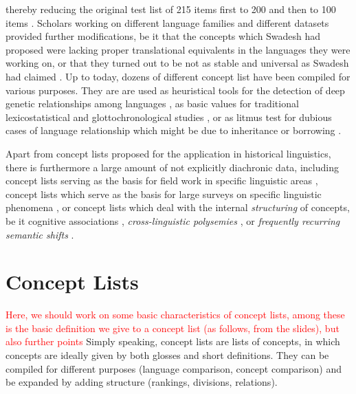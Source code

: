 \documentclass[10pt, a4paper]{article}
\begin{document}
thereby reducing the original test list of 215 items first to 200 \cite{Swadesh1952} and then to 100
items \cite{Swadesh1955}. Scholars working on different language families and different datasets
provided further modifications, be it that the concepts which Swadesh had proposed were lacking
proper translational equivalents in the languages they were working on, or that they
turned out to be not as stable and universal as Swadesh had claimed \cite{Matisoff1978,Alpher1999}. 
Up to today, dozens of different concept list have been compiled for various purposes.
They are are used as heuristical tools for the detection of deep genetic
relationships among languages \cite{Dolgopolsky1964}, 
as basic values for traditional
lexicostatistical and glottochronological studies \cite{Dyen1992,Starostin1991}, 
or as litmus test
for dubious cases of language relationship which might be due to inheritance or borrowing 
\cite{McMahon2005b,Chen1996,Wang2006}. 
 
Apart from concept lists proposed for the application in historical linguistics, there is
furthermore a large amount of not explicitly diachronic data, including concept lists serving as the
basis for field work in specific linguistic areas \cite{Kraft1981}, concept lists which serve as the
basis for large surveys on specific linguistic phenomena \cite{Wold2009}, or concept lists which deal with
the internal \emph{structuring} of concepts, be it cognitive associations \cite{Nelson2004},
\emph{cross-linguistic polysemies} \cite{List2014f}, or \emph{frequently recurring semantic shifts}
\cite{Bulakh2013}. 
\section{Concept Lists}
\textcolor{red}{Here, we should work on some basic characteristics of concept lists, among these is
the basic definition we give to a concept list (as follows, from the slides), but also further
points}
Simply speaking, concept lists are lists of concepts, in which
concepts are ideally given by both glosses and short definitions. 
They can be compiled for different purposes (language
comparison, concept comparison) and be expanded by adding structure (rankings, divisions, relations).
\end{document}
